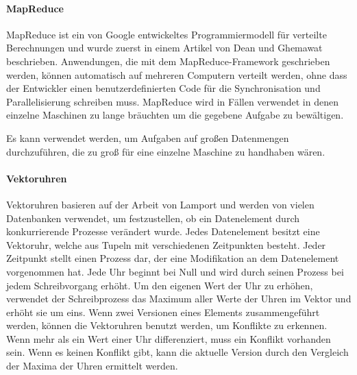 \paragraph{MapReduce} MapReduce ist ein von Google entwickeltes Programmiermodell für verteilte Berechnungen und wurde zuerst in einem Artikel von Dean und Ghemawat \cite{Dean:2008:MSD:1327452.1327492} beschrieben. Anwendungen, die mit dem MapReduce-Framework geschrieben werden, können automatisch auf mehreren Computern verteilt werden, ohne dass der Entwickler einen benutzerdefinierten Code für die Synchronisation und Parallelisierung schreiben muss. MapReduce wird in Fällen verwendet in denen einzelne Maschinen zu lange bräuchten um die gegebene Aufgabe zu bewältigen. 


Es kann verwendet werden, um Aufgaben auf großen Datenmengen durchzuführen, die zu groß für eine einzelne Maschine zu handhaben wären.

\paragraph{Vektoruhren}
Vektoruhren  basieren auf der Arbeit von Lamport \cite{Lamport:1978:TCO:359545.359563} und werden von vielen Datenbanken verwendet, um festzustellen, ob ein Datenelement durch konkurrierende Prozesse verändert wurde. Jedes Datenelement besitzt eine Vektoruhr, welche aus Tupeln mit verschiedenen Zeitpunkten besteht. Jeder Zeitpunkt stellt einen Prozess dar, der eine Modifikation an dem Datenelement vorgenommen hat. Jede Uhr beginnt bei Null und wird durch seinen Prozess bei jedem Schreibvorgang erhöht. Um den eigenen Wert der Uhr zu erhöhen, verwendet der Schreibprozess das Maximum aller Werte der Uhren im Vektor und erhöht sie um eins. Wenn zwei Versionen eines Elements zusammengeführt werden, können die Vektoruhren benutzt werden, um Konflikte zu erkennen. Wenn mehr als ein Wert einer Uhr differenziert, muss ein Konflikt vorhanden sein. Wenn es keinen Konflikt gibt, kann die aktuelle Version durch den Vergleich der Maxima der Uhren ermittelt werden.

